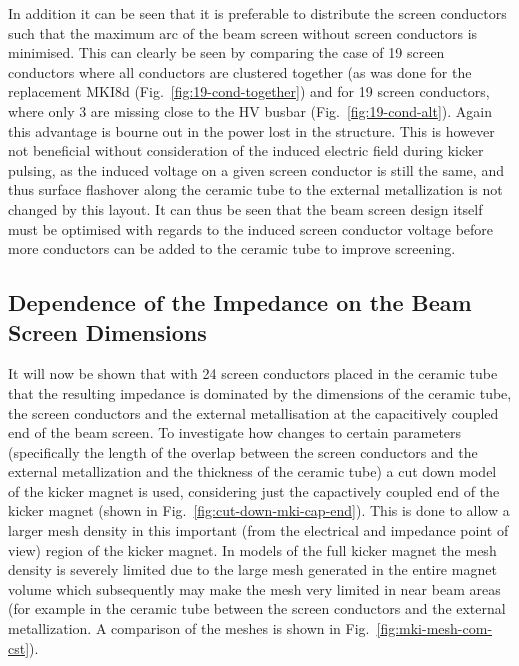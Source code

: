 In addition it can be seen that it is preferable to distribute the screen conductors such that the maximum arc of the beam screen without screen conductors is minimised. This can clearly be seen by comparing the case of 19 screen conductors where all conductors are clustered together (as was done for the replacement MKI8d (Fig.~\ref{fig:19-cond-together}) and for 19 screen conductors, where only 3 are missing close to the HV busbar (Fig.~\ref{fig:19-cond-alt}). Again this advantage is bourne out in the power lost in the structure. This is however not beneficial without consideration of the induced electric field during kicker pulsing, as the induced voltage on a given screen conductor is still the same, and thus surface flashover along the ceramic tube to the external metallization is not changed by this layout. It can thus be seen that the beam screen design itself must be optimised with regards to the induced screen conductor voltage before more conductors can be added to the ceramic tube to improve screening.

\subsection{Dependence of the Impedance on the Beam Screen Dimensions}

It will now be shown that with 24 screen conductors placed in the ceramic tube that the resulting impedance is dominated by the dimensions of the ceramic tube, the screen conductors and the external metallisation at the capacitively coupled end of the beam screen. To investigate how changes to certain parameters (specifically the length of the overlap between the screen conductors and the external metallization and the thickness of the ceramic tube) a cut down model of the kicker magnet is used, considering just the capactively coupled end of the kicker magnet (shown in Fig.~\ref{fig:cut-down-mki-cap-end}). This is done to allow a larger mesh density in this important (from the electrical and impedance point of view) region of the kicker magnet. In models of the full kicker magnet the mesh density is severely limited due to the large mesh generated in the entire magnet volume which subsequently may make the mesh very limited in near beam areas (for example in the ceramic tube between the screen conductors and the external metallization. A comparison of the meshes is shown in Fig.~\ref{fig:mki-mesh-com-cst}). 

